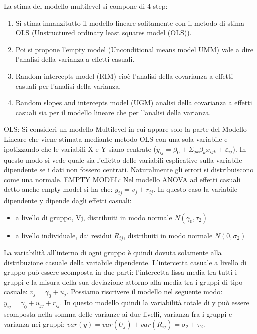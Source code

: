 \documentclass[a4page, 11pt]{article} %
\begin{document}
La stima del modello multilevel si compone di 4 step:
\begin{enumerate}[noitemsep]
\item Si stima innanzitutto il modello lineare solitamente con il metodo di stima OLS (Unstructured ordinary least squares model (OLS)).
\item Poi si propone l’empty model (Unconditional means model UMM) vale a dire l’analisi della varianza a effetti casuali.
\item Random intercepts model (RIM) cioè l’analisi della covarianza a effetti casuali per l’analisi della varianza.
\item Random slopes and intercepts model (UGM) analisi della covarianza a effetti casuali sia per il modello lineare che per l’analisi della varianza.
\end{enumerate}
OLS: 
Si consideri un modello Multilevel in cui appare solo la parte del Modello Lineare che viene stimata mediante metodo OLS con una sola variabile e ipotizzando che le variabili X e Y siano centrate ($y_{ij}= \beta_0+\Sigma_{jk} \beta_k x_{ijk}+\varepsilon_{ij}$).
\newline
In questo modo si vede quale sia l’effetto delle variabili esplicative sulla variabile dipendente se i dati non fossero centrati. Naturalmente gli errori si distribuiscono come una normale. 
\newline
EMPTY MODEL:
Nel modello ANOVA ad effetti casuali detto anche empty model si ha che: $y_{ij}=v_j+r_{ij}$.
In questo caso la variabile dipendente y dipende dagli effetti casuali:
\begin{itemize}
\item a livello di gruppo, Vj, distribuiti in modo normale $N(\gamma_0, \tau_2)$
\item a livello individuale, dai residui $R_{ij}$, distribuiti in modo normale $N(0, \sigma_2)$ 
\end{itemize}
La variabilità all’interno di ogni gruppo è quindi dovuta solamente alla distribuzione casuale della variabile dipendente.
\newline
L’intercetta casuale a livello di gruppo può essere scomposta in due parti: l’intercetta fissa media tra tutti i gruppi e la misura della sua deviazione attorno alla media tra i gruppi di tipo casuale: $v_j=\gamma_0+u_j$.
\newline
Possiamo riscrivere il modello nel seguente modo: $y_{ij}=\gamma_0+u_{jj}+r_{ij}$.
\newline
In questo modello quindi la variabilità totale di y può essere scomposta nella somma delle varianze ai due livelli, varianza fra i gruppi e varianza nei gruppi: $var(y)=var(U_j)+var(R_{ij})=\sigma_2+\tau_2$.
\end{document}
